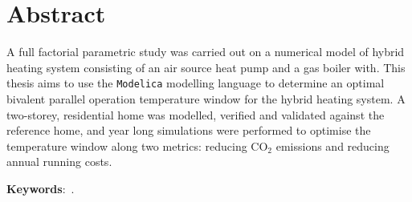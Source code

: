 

\begingroup
\let\clearpage\relax
\let\cleardoublepage\relax
\let\cleardoublepage\relax

\chapter*{Abstract}

A full factorial parametric study was carried out on a numerical model of hybrid heating system consisting of an air source heat pump and a gas boiler with. This thesis aims to use the \texttt{Modelica} modelling language to determine an optimal bivalent parallel operation temperature window for the hybrid heating system. A two-storey, residential home was modelled, verified and validated against the reference home, and year long simulations were performed to optimise the temperature window along two metrics: reducing $\text{CO}_2$ emissions and reducing annual running costs. 

\bigskip\bigskip\bigskip\bigskip
\textbf{Keywords}:~\mykeywords.



\endgroup

